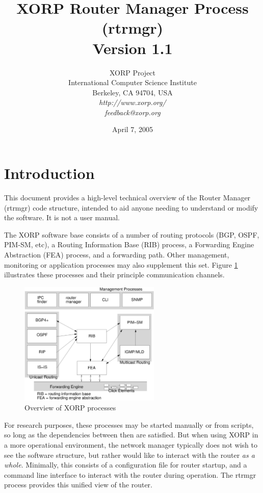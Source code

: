 \documentclass[11pt]{article}
\title{XORP Router Manager Process (rtrmgr) \\
\vspace{1ex}
Version 1.1}
\author{ XORP Project					\\
	 International Computer Science Institute	\\
	 Berkeley, CA 94704, USA			\\
         {\it http://www.xorp.org/}			\\
	 {\it feedback@xorp.org}
}
\date{April 7, 2005}
\begin{document}
\maketitle

\section{Introduction}

This document provides a high-level technical overview of the Router
Manager (rtrmgr) code structure, intended to aid anyone needing to
understand or modify the software.   It is not a user manual.

The XORP software base consists of a number of routing protocols (BGP,
OSPF, PIM-SM, etc), a Routing Information Base (RIB) process, a
Forwarding Engine Abstraction (FEA) process, and a forwarding path.
Other management, monitoring or application processes may also
supplement this set.  Figure \ref{overview} illustrates these
processes and their principle communication channels.

\begin{figure}[htb]
\centerline{\includegraphics[width=0.6\textwidth]{figs/processes3}}
\vspace{.05in}
\caption{\label{overview}Overview of XORP processes}
\end{figure}

For research purposes, these processes may be started manually or from
scripts, so long as the dependencies between then are satisfied.  But
when using XORP in a more operational environment, the network manager
typically does not wish to see the software structure, but rather
would like to interact with the router {\it as a whole}.  Minimally, this
consists of a configuration file for router startup, and a command
line interface to interact with the router during operation.  The
rtrmgr process provides this unified view of the router.
\end{document}
